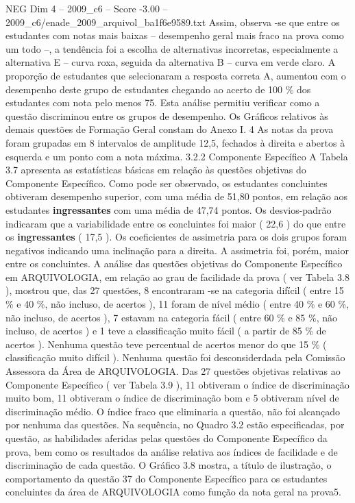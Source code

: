 \begin{textsample}{NEG Dim 4 – 2009\_c6 – Score -3.00 – 2009\_c6/enade\_2009\_arquivol\_ba1f6e9589.txt}
Assim, observa -se que entre os estudantes com notas mais baixas – desempenho geral mais fraco na prova como um todo –, a tendência foi a escolha de alternativas incorretas, especialmente a alternativa E – curva roxa, seguida da alternativa B – curva em verde claro.
A proporção de estudantes que selecionaram a resposta correta A, aumentou com o desempenho deste grupo de estudantes chegando ao acerto de 100 \% dos estudantes com nota pelo menos 75.
Esta análise permitiu verificar como a questão discriminou entre os grupos de desempenho.
Os Gráficos relativos às demais questões de Formação Geral constam do Anexo I. 4 As notas da prova foram grupadas em 8 intervalos de amplitude 12,5, fechados à direita e abertos à esquerda e um ponto com a nota máxima. 3.2.2 Componente Específico A Tabela 3.7 apresenta as estatísticas básicas em relação às questões objetivas do Componente Específico.
Como pode ser observado, os estudantes concluintes obtiveram desempenho superior, com uma média de 51,80 pontos, em relação aos estudantes \textbf{ingressantes} com uma média de 47,74 pontos.
Os desvios-padrão indicaram que a variabilidade entre os concluintes foi maior ( 22,6 ) do que entre os \textbf{ingressantes} ( 17,5 ).
Os coeficientes de assimetria para os dois grupos foram negativos indicando uma inclinação para a direita.
A assimetria foi, porém, maior entre os concluintes.
A análise das questões objetivas do Componente Específico em ARQUIVOLOGIA, em relação ao grau de facilidade da prova ( ver Tabela 3.8 ), mostrou que, das 27 questões, 8 encontraram -se na categoria difícil ( entre 15 \% e 40 \%, não incluso, de acertos ), 11 foram de nível médio ( entre 40 \% e 60 \%, não incluso, de acertos ), 7 estavam na categoria fácil ( entre 60 \% e 85 \%, não incluso, de acertos ) e 1 teve a classificação muito fácil ( a partir de 85 \% de acertos ).
Nenhuma questão teve percentual de acertos menor do que 15 \% ( classificação muito difícil ).
Nenhuma questão foi desconsiderdada pela Comissão Assessora da Área de ARQUIVOLOGIA.
Das 27 questões objetivas relativas ao Componente Específico ( ver Tabela 3.9 ), 11 obtiveram o índice de discriminação muito bom, 11 obtiveram o índice de discriminação bom e 5 obtiveram nível de discriminação médio.
O índice fraco que eliminaria a questão, não foi alcançado por nenhuma das questões.
Na sequência, no Quadro 3.2 estão especificadas, por questão, as habilidades aferidas pelas questões do Componente Específico da prova, bem como os resultados da análise relativa aos índices de facilidade e de discriminação de cada questão.
O Gráfico 3.8 mostra, a título de ilustração, o comportamento da questão 37 do Componente Específico para os estudantes concluintes da área de ARQUIVOLOGIA como função da nota geral na prova5.

\end{textsample}

